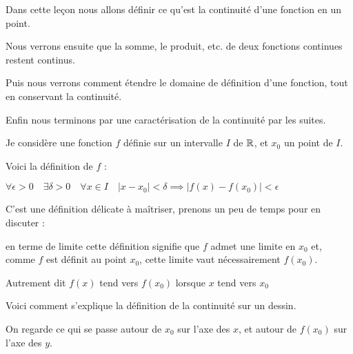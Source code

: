 







\debuttexte



\diapo

\change

\change

Dans cette leçon nous allons définir ce qu'est la continuité d'une fonction en 
un point.

\change

Nous verrons ensuite que la somme, le produit, etc. de deux fonctions continues 
restent continus.

\change

Puis nous verrons comment étendre le domaine de définition d'une fonction,
tout en conservant la continuité.

\change

Enfin nous terminons par une caractérisation de la continuité par les suites.


\diapo

Je considère une fonction $f$ définie sur un intervalle $I$ de $\mathbb{R}$, et $x_0$ un point de $I$.


Voici la définition de $f$  :


$\forall \epsilon>0 \quad \exists \delta>0 \quad \forall x\in I \quad \vert x-x_0\vert <\delta 
\implies \vert f(x)-f(x_0)\vert <\epsilon$

C'est une définition délicate à maîtriser, prenons un peu de temps pour en discuter :

\change

en terme de limite cette définition signifie que 
$f$ admet une limite en $x_0$  et, comme $f$ est définit au point $x_0$, cette limite vaut nécessairement $f(x_0)$.
 
 
Autrement dit $f(x)$ tend vers $f(x_0)$ lorsque $x$ tend vers $x_0$
 
 
 
\change

Voici comment s'explique la définition de la continuité sur un dessin.


On regarde ce qui se passe autour de $x_0$ sur l'axe des $x$, et autour de $f(x_0)$
sur l'axe des $y$.

